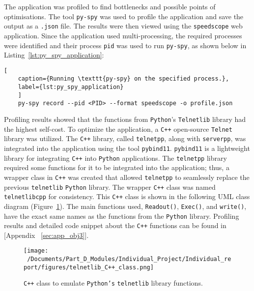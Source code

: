 The application was profiled to find bottlenecks and possible points of optimisations. The tool \texttt{py-spy} was used to profile the application and save the output as a \texttt{.json} file\cite{py-spy}. The results were then viewed using the \texttt{speedscope} web application\cite{speedscope_app}. Since the application used multi-processing, the required processes were identified and their process \texttt{pid} was used to run \texttt{py-spy}, as shown below in Listing~\ref{lst:py_spy_application}:

\begin{lstlisting}[
	caption={Running \texttt{py-spy} on the specified process.},
	label={lst:py_spy_application}
	]
	py-spy record --pid <PID> --format speedscope -o profile.json 
\end{lstlisting}


Profiling results showed that the functions from \texttt{Python}'s \texttt{Telnetlib} library had the highest self-cost. To optimize the application, a \texttt{C++} open-source \texttt{Telnet} library was utilized. The \texttt{C++} library, called \texttt{telnetpp},\cite{telnetpp_library} along with \texttt{serverpp},\cite{serverpp_library} was integrated into the application using the tool \texttt{pybind11}. \texttt{pybind11} is a lightweight library for integrating \texttt{C++} into \texttt{Python} applications\cite{pybind11}. The \texttt{telnetpp} library required some functions for it to be integrated into the application; thus, a wrapper class in \texttt{C++} was created that allowed \texttt{telnetpp} to seamlessly replace the previous \texttt{telnetlib} \texttt{Python} library. The wrapper \texttt{C++} class was named \texttt{telnetlibcpp} for consistency. This \texttt{C++} class is shown in the following UML class diagram (Figure~\ref{fig:telnetlibcpp_UML}). The main functions used, \texttt{Readout()}, \texttt{Exec()}, and \texttt{write()}, have the exact same names as the functions from the \texttt{Python} library. Profiling results and detailed code snippet about the \texttt{C++} functions can be found in [Appendix ~\ref{sec:app_obj3}]. 

\begin{figure}[htbp] %
	\centering
	\texttt{[image: ~/Documents/Part\_D\_Modules/Individual\_Project/Individual\_report/figures/telnetlib\_C++\_class.png]} %
	\caption{\texttt{C++} class to emulate \texttt{Python's} \texttt{telnetlib} library functions.}
	\label{fig:telnetlibcpp_UML} %
\end{figure}

